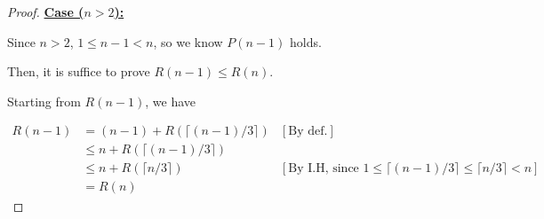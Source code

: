 \documentclass[12pt]{article}
\begin{document}
\begin{enumerate}[a.]
\begin{proof}
        \bigskip

        \underline{\textbf{Case ($n > 2$):}}

        \bigskip

        Since $n > 2$, $1 \leq n - 1 < n$, so we know $P(n-1)$ holds.

        \bigskip

        Then, it is suffice to prove $R(n-1) \leq R(n)$.

        \bigskip

        Starting from $R(n-1)$, we have

        \begin{align}
            R(n-1) &= (n-1) + R(\lceil (n-1)/3 \rceil) & [\text{By def.}]\\
            &\leq n + R(\lceil (n-1)/3 \rceil) \\
            &\leq n + R(\lceil n/3 \rceil) & [\text{By I.H, since $1 \leq \lceil (n-1)/3 \rceil \leq \lceil n/3 \rceil < n$}]\\
            &= R(n)
        \end{align}
    \end{proof}














\end{enumerate}
\end{document}
